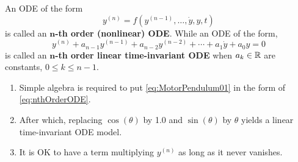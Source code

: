 \begin{tcolorbox}[colback=mylightblue, title = {\bf High-order ODEs of a Single Variable}, breakable]
\begin{definition}
\label{def:nthOrderODE}
 An ODE of the form
\begin{equation}
\label{eq:nthOrderODE}
   y^{(n)} = f(y^{(n-1)}, \ldots, \dot{y}, y, t)
\end{equation}
is called an \textbf{$\bm{n}$-th order (nonlinear) ODE}. While an ODE of the form,
\begin{equation}
\label{eq:nthOrderLTIode}
   y^{(n)} + a_{n-1} y^{(n-1)} + a_{n-2} y^{(n-2)} +  \cdots +  a_1 \dot{y} + a_0 y = 0
\end{equation}
is called an \textbf{$\bm{n}$-th order linear time-invariant ODE} when $a_{k} \in \mathbb R$ are constants, $0 \le k \le n-1$.
\end{definition}

 \begin{enumerate}
\renewcommand{\labelenumi}{(\alph{enumi})}
\setlength{\itemsep}{.2cm}
    \item Simple algebra is required to put \eqref{eq:MotorPendulum01} in the form of \eqref{eq:nthOrderODE}.
    \item After which, replacing $\cos(\theta)$  by 1.0 and $\sin(\theta)$ by $\theta$ yields a linear time-invariant ODE model.
    \item It is OK to have a term multiplying $y^{(n)}$ as long as it never vanishes.
\end{enumerate}
\end{tcolorbox}

    

\bigskip

